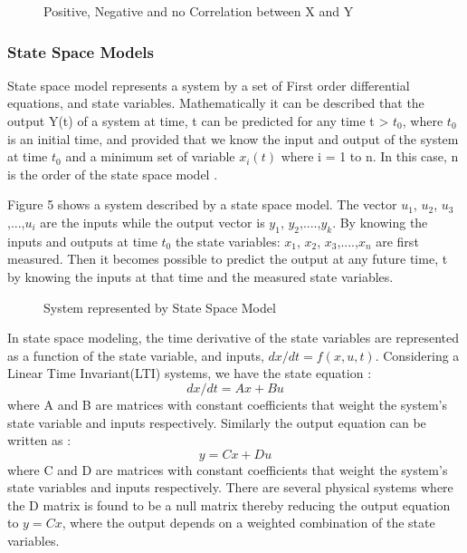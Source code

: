 \documentclass[article,type=msc,colorback,12pt,accentcolor=tud7b,table]{tudthesis}
\begin{document}
 \begin{figure}
 \begin{center}
  \makebox[\textwidth]{\texttt{[image: B7]}}
\end{center}
\caption{Positive, Negative and no Correlation between X and Y }
\end{figure}

\subsubsection{State Space Models}

State space model represents a system by a set of First order differential equations, and state variables. Mathematically it can be described that the output Y(t) of a system at time, t can be predicted for any time t > $t_0$,  where $t_0$ is an initial time, and provided that we know the input and output of the system at time $t_0$ and a minimum set of variable $x_i(t)$ where i = 1 to n. In this case, n is the order of the state space model \cite{rowell2002state}. 

Figure 5 shows a system described by a state space model. The vector $u_1$, $u_2$, $u_3$,...,$u_i$ are the inputs while the output vector is $y_1$, $y_2$,....,$y_k$. By knowing the inputs and outputs at time $t_0$ the state variables: $x_1$, $x_2$, $x_3$,....,$x_n$ are first measured. Then it becomes possible to predict the output at any future time, t by knowing the inputs at that time and the measured state variables.

 \begin{figure}
 \begin{center}
  \makebox[\textwidth]{\texttt{[image: B6]}}
\end{center}
\caption{System represented by State Space Model}
\end{figure}

In state space modeling, the time derivative of the state variables are represented as a function of the state variable, and inputs, $dx/dt = f(x,u,t)$. Considering a Linear Time Invariant(LTI) systems, we have the state equation \cite{rowell2002state}: $$ dx/dt = Ax + Bu $$ where A and B are matrices with constant coefficients that weight the system's state variable and inputs respectively. Similarly the output equation can be written as \cite{rowell2002state}: $$ y = Cx + Du $$ where C and D are matrices with constant coefficients that weight the system's state variables and inputs respectively. There are several physical systems where the D matrix is found to be a null matrix thereby reducing the output equation to $ y = Cx $, where the output depends on a weighted combination of the state variables.
\end{document}
